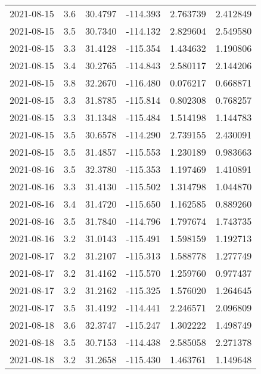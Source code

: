 \begin{tabular}{lrrrrr}
2021-08-15 &       3.6 &  30.4797 &  -114.393 &         2.763739 &         2.412849 \\
2021-08-15 &       3.5 &  30.7340 &  -114.132 &         2.829604 &         2.549580 \\
2021-08-15 &       3.3 &  31.4128 &  -115.354 &         1.434632 &         1.190806 \\
2021-08-15 &       3.4 &  30.2765 &  -114.843 &         2.580117 &         2.144206 \\
2021-08-15 &       3.8 &  32.2670 &  -116.480 &         0.076217 &         0.668871 \\
2021-08-15 &       3.3 &  31.8785 &  -115.814 &         0.802308 &         0.768257 \\
2021-08-15 &       3.3 &  31.1348 &  -115.484 &         1.514198 &         1.144783 \\
2021-08-15 &       3.5 &  30.6578 &  -114.290 &         2.739155 &         2.430091 \\
2021-08-15 &       3.5 &  31.4857 &  -115.553 &         1.230189 &         0.983663 \\
2021-08-16 &       3.5 &  32.3780 &  -115.353 &         1.197469 &         1.410891 \\
2021-08-16 &       3.3 &  31.4130 &  -115.502 &         1.314798 &         1.044870 \\
2021-08-16 &       3.4 &  31.4720 &  -115.650 &         1.162585 &         0.889260 \\
2021-08-16 &       3.5 &  31.7840 &  -114.796 &         1.797674 &         1.743735 \\
2021-08-16 &       3.2 &  31.0143 &  -115.491 &         1.598159 &         1.192713 \\
2021-08-17 &       3.2 &  31.2107 &  -115.313 &         1.588778 &         1.277749 \\
2021-08-17 &       3.2 &  31.4162 &  -115.570 &         1.259760 &         0.977437 \\
2021-08-17 &       3.2 &  31.2162 &  -115.325 &         1.576020 &         1.264645 \\
2021-08-17 &       3.5 &  31.4192 &  -114.441 &         2.246571 &         2.096809 \\
2021-08-18 &       3.6 &  32.3747 &  -115.247 &         1.302222 &         1.498749 \\
2021-08-18 &       3.5 &  30.7153 &  -114.438 &         2.585058 &         2.271378 \\
2021-08-18 &       3.2 &  31.2658 &  -115.430 &         1.463761 &         1.149648 \\

\end{tabular}
